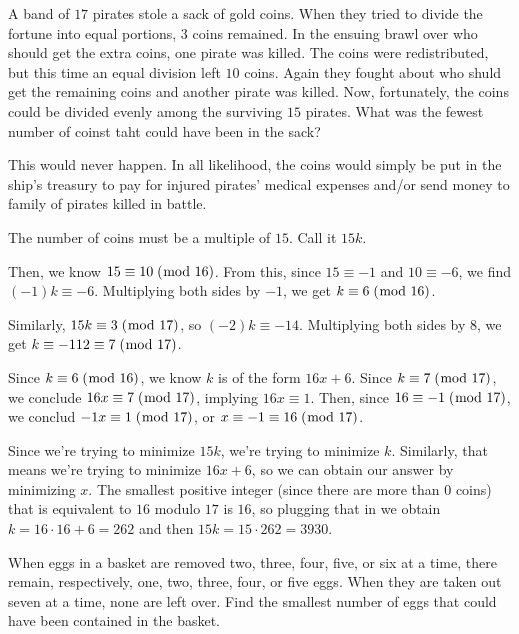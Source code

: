 \documentclass[../main.tex]{subfiles}
\begin{document}
\begin{ex} \label{3.25}
  A band of $17$ pirates stole a sack of gold coins. When they tried to divide the fortune into equal portions, $3$ coins remained. In the ensuing brawl over who should get the extra coins, one pirate was killed. The coins were redistributed, but this time an equal division left $10$ coins. Again they fought about who shuld get the remaining coins and another pirate was killed. Now, fortunately, the coins could be divided evenly among the surviving $15$ pirates. What was the fewest number of coinst taht could have been in the sack?
\end{ex}

This would never happen. In all likelihood, the coins would simply be put in the ship's treasury to pay for injured pirates' medical expenses and/or send money to family of pirates killed in battle.

The number of coins must be a multiple of $15$. Call it $15k$.

Then, we know $15 \equiv 10 \; (\bmod \; 16)$. From this, since $15 \equiv -1$ and $10 \equiv -6$, we find $(-1) k \equiv -6$. Multiplying both sides by $-1$, we get $k \equiv 6 \; (\bmod \; 16)$.

Similarly, $15k \equiv 3 \; (\bmod \; 17)$, so $(-2)k \equiv -14$. Multiplying both sides by $8$, we get $k \equiv -112 \equiv 7 \; (\bmod \; 17)$.

Since $k \equiv 6 \; (\bmod \; 16)$, we know $k$ is of the form $16x + 6$. Since $k \equiv 7 \; (\bmod \; 17)$, we conclude $16x \equiv 7 \; (\bmod \; 17)$, implying $16x \equiv 1$. Then, since $16 \equiv -1 \; (\bmod \; 17)$, we conclud $-1x \equiv 1 \; (\bmod \; 17)$, or $x \equiv -1 \equiv 16 \; (\bmod \; 17)$.

Since we're trying to minimize $15k$, we're trying to minimize $k$. Similarly, that means we're trying to minimize $16x + 6$, so we can obtain our answer by minimizing $x$. The smallest positive integer (since there are more than $0$ coins) that is equivalent to $16$ modulo $17$ is $16$, so plugging that in we obtain $k = 16 \cdot 16 + 6 = 262$ and then $15k = 15 \cdot 262 = 3930$.



\begin{ex} \label{3.26}
  When eggs in a basket are removed two, three, four, five, or six at a time, there remain, respectively, one, two, three, four, or five eggs. When they are taken out seven at a time, none are left over. Find the smallest number of eggs that could have been contained in the basket.
\end{ex}
\end{document}
